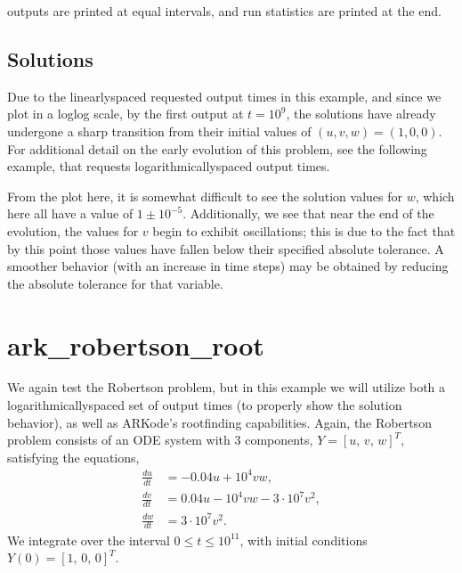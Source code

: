 \documentclass[letterpaper,10pt,english]{sphinxmanual}
\begin{document}
 outputs are printed at equal intervals, and run statistics are
printed at the end.


\subsection{Solutions}
\label{\detokenize{c_serial:id14}}
\sphinxAtStartPar
Due to the linearly\sphinxhyphen{}spaced requested output times in this example, and
since we plot in a log\sphinxhyphen{}log scale, by the first output at
\(t=10^9\), the solutions have already undergone a sharp
transition from their initial values of \((u,v,w) = (1, 0, 0)\).
For additional detail on the early evolution of this problem, see the
following example, that requests logarithmically\sphinxhyphen{}spaced output times.

\sphinxAtStartPar
From the plot here, it is somewhat difficult to see the solution
values for \(w\), which here all have a value of
\(1 \pm 10^{-5}\).  Additionally, we see that near the end of the
evolution, the values for \(v\) begin to exhibit oscillations;
this is due to the fact that by this point those values have fallen
below their specified absolute tolerance.  A smoother behavior (with
an increase in time steps) may be obtained by reducing the absolute
tolerance for that variable.

\begin{figure}[htbp]
\centering

\noindent{}
\end{figure}


\section{ark\_robertson\_root}
\label{\detokenize{c_serial:ark-robertson-root}}\label{\detokenize{c_serial:id15}}
\sphinxAtStartPar
We again test the Robertson problem, but in this example we will
utilize both a logarithmically\sphinxhyphen{}spaced set of output times (to properly
show the solution behavior), as well as ARKode’s root\sphinxhyphen{}finding
capabilities.  Again, the Robertson problem consists of an ODE system
with 3 components, \(Y = [u,\, v,\, w]^T\), satisfying the equations,
\begin{equation*}
\begin{split}\frac{du}{dt} &= -0.04 u + 10^4 v w, \\
\frac{dv}{dt} &= 0.04 u - 10^4 v w - 3\cdot10^7 v^2, \\
\frac{dw}{dt} &= 3\cdot10^7 v^2.\end{split}
\end{equation*}
\sphinxAtStartPar
We integrate over the interval \(0\le t\le 10^{11}\), with initial
conditions  \(Y(0) = [1,\, 0,\, 0]^T\).
\end{document}
